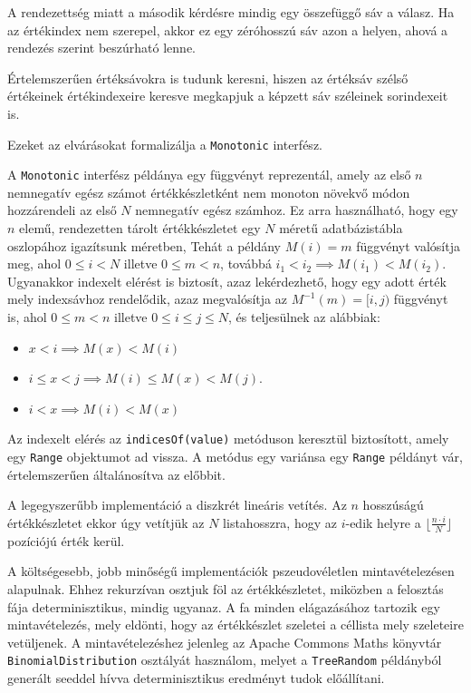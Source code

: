 \documentclass[
    parspace,
    noindent,
    nohyp,
]{elteiktdk}[2023/04/10]
\begin{document}
A rendezettség miatt a második kérdésre mindig egy összefüggő sáv a válasz. Ha az értékindex nem szerepel, akkor ez egy zéróhosszú sáv azon a helyen, ahová a rendezés szerint beszúrható lenne.

Értelemszerűen értéksávokra is tudunk keresni, hiszen az értéksáv szélső értékeinek értékindexeire keresve megkapjuk a képzett sáv széleinek sorindexeit is.

Ezeket az elvárásokat formalizálja a \texttt{Monotonic} interfész.

A \texttt{Monotonic} interfész példánya egy függvényt reprezentál,
amely az első $n$ nemnegatív egész számot értékkészletként nem monoton növekvő módon hozzárendeli az első $N$ nemnegatív egész számhoz.
Ez arra használható, hogy egy $n$ elemű, rendezetten tárolt értékkészletet egy $N$ méretű adatbázistábla oszlopához igazítsunk méretben,
Tehát a példány $M(i) = m$ függvényt valósítja meg, ahol $0 \leq i < N$ illetve $0 \leq m < n$, továbbá $i_1 < i_2 \implies M(i_1) < M(i_2)$.
Ugyanakkor indexelt elérést is biztosít, azaz lekérdezhető, hogy egy adott érték mely indexsávhoz rendelődik,
azaz megvalósítja az $M^{-1}(m) = [i, j)$ függvényt is, ahol $0 \leq m < n$ illetve $0 \leq i \leq j \leq N$, és teljesülnek az alábbiak:

\begin{itemize}
\item $x < i \implies M(x) < M(i)$
\item $i \leq x < j \implies M(i) \leq M(x) < M(j)$.
\item $i < x \implies M(i) < M(x)$
\end{itemize}

Az indexelt elérés az \texttt{indicesOf(value)} metóduson keresztül biztosított, amely egy \texttt{Range} objektumot ad vissza.
A metódus egy variánsa egy \texttt{Range} példányt vár, értelemszerűen általánosítva az előbbit.

A legegyszerűbb implementáció a diszkrét lineáris vetítés.
Az $n$ hosszúságú értékkészletet ekkor úgy vetítjük az $N$ listahosszra,
hogy az $i$-edik helyre a $\lfloor \frac{n \cdot i}{N} \rfloor$ pozíciójú érték kerül.

A költségesebb, jobb minőségű implementációk pszeudovéletlen mintavételezésen alapulnak.
Ehhez rekurzívan osztjuk föl az értékkészletet, miközben a felosztás fája determinisztikus, mindig ugyanaz.
A fa minden elágazásához tartozik egy mintavételezés, mely eldönti,
hogy az értékkészlet szeletei a céllista mely szeleteire vetüljenek.
A mintavételezéshez jelenleg az Apache Commons Maths könyvtár
\texttt{BinomialDistribution} osztályát használom,
melyet a \texttt{TreeRandom} példányból generált seeddel hívva
determinisztikus eredményt tudok előállítani.
\end{document}
